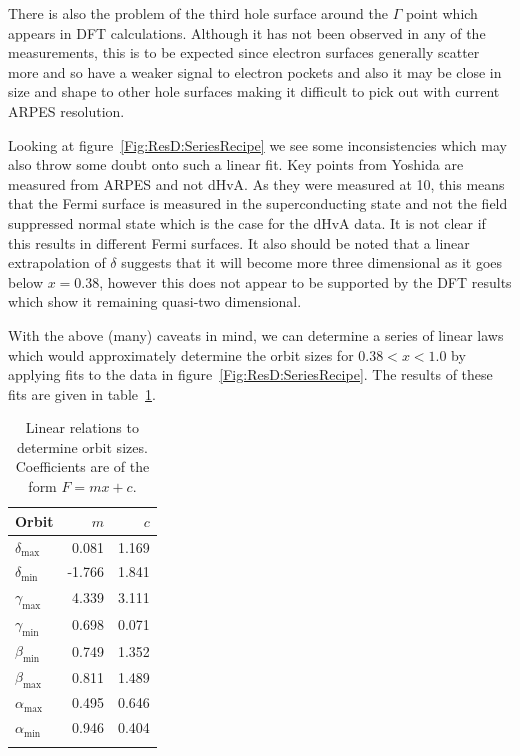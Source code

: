 There is also the problem of the third hole surface around the $\Gamma$ point which appears in \ac{DFT} calculations. Although it has not been observed in any of the measurements, this is to be expected since electron surfaces generally scatter more and so have a weaker signal to electron pockets and also it may be close in size and shape to other hole surfaces making it difficult to pick out with current \ac{ARPES} resolution.

Looking at figure~\ref{Fig:ResD:SeriesRecipe} we see some inconsistencies which may also throw some doubt onto such a linear fit. Key points from Yoshida \etal are measured from \ac{ARPES} and not \ac{dHvA}. As they were measured at \unit{10}{\kelvin}, this means that the Fermi surface is measured in the superconducting state and not the field suppressed normal state which is the case for the \ac{dHvA} data. It is not clear if this results in different Fermi surfaces. It also should be noted that a linear extrapolation of $\delta$ suggests that it will become more three dimensional as it goes below $x=0.38$, however this does not appear to be supported by the \ac{DFT} results which show it remaining quasi-two dimensional. 

With the above (many) caveats in mind, we can determine a series of linear laws which would approximately determine the orbit sizes for $0.38 < x < 1.0$ by applying fits to the data in figure~\ref{Fig:ResD:SeriesRecipe}. The results of these fits are given in table~\ref{Table:ResD:SeriesRecipeFits}.
\begin{table}
    \begin{center}
           \caption{Linear relations to determine orbit sizes. Coefficients are of the form $F=mx+c$.}
        \begin{tabular}[htbp]{lrr}
\toprule
Orbit   & $m$   & $c$   \\
\midrule
$\delta_{\textrm{max}}$ & 0.081 & 1.169 \\
$\delta_{\textrm{min}}$ & -1.766 & 1.841 \\
$\gamma_{\textrm{max}}$ & 4.339 & 3.111 \\
$\gamma_{\textrm{min}}$ & 0.698 &  0.071 \\
$\beta_{\textrm{min}}$ & 0.749 & 1.352 \\
$\beta_{\textrm{max}}$ & 0.811 & 1.489 \\
$\alpha_{\textrm{max}}$ & 0.495 & 0.646 \\
$\alpha_{\textrm{min}}$ & 0.946 & 0.404 \\
\bottomrule
        \label{Table:ResD:SeriesRecipeFits}
        \end{tabular}
    \end{center}
\end{table}

